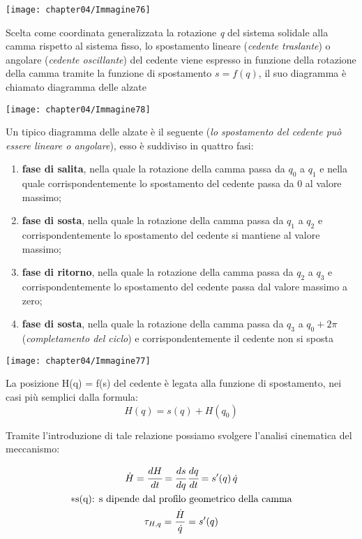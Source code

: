 		\begin{minipage}{.3\textwidth}
		\centering
		\texttt{[image: chapter04/Immagine76]}
		\end{minipage}
		\hfill
		\begin{minipage}{.7\textwidth}
	
		
		Scelta come coordinata generalizzata la rotazione \emph{q} del sistema solidale alla camma rispetto al sistema fisso, lo spostamento lineare (\emph{cedente traslante}) o angolare (\emph{cedente oscillante}) del cedente viene espresso in funzione della rotazione della camma tramite la funzione di spostamento $s = f(q)$, il suo diagramma è chiamato diagramma delle alzate
		

		\centering
		\texttt{[image: chapter04/Immagine78]}
		\end{minipage}
		
		Un tipico diagramma delle alzate è il seguente (\emph{lo spostamento del cedente può essere lineare o angolare}), esso è suddiviso in quattro fasi:
		\begin{enumerate}[$\Rightarrow$]
		\item \textbf{fase di salita}, nella quale la rotazione della camma passa da $q_0$ a $q_1$ e nella quale corrispondentemente lo spostamento del cedente passa da 0 al valore massimo;
		\item \textbf{fase di sosta}, nella quale la rotazione della camma passa da $q_1$ a $q_2$ e corrispondentemente lo spostamento del cedente si mantiene al valore massimo;
		\item \textbf{fase di ritorno}, nella quale la rotazione della camma passa da $q_2$ a $q_3$ e corrispondentemente lo spostamento del cedente passa dal valore massimo a zero;
		\item \textbf{fase di sosta}, nella quale la rotazione della camma passa da $q_3$ a $q_0 + 2 \pi$ (\emph{completamento del ciclo}) e corrispondentemente il cedente non si sposta
		\end{enumerate} 
		
		\begin{minipage}{.5\textwidth}
		\centering
		\texttt{[image: chapter04/Immagine77]}
		\end{minipage}
		\hfill
		\begin{minipage}{.5\textwidth}
		La posizione H(q) = f(s) del cedente è legata alla funzione di spostamento, nei casi più semplici dalla formula:
		\[
		H(q) = s(q) + H(q_0)
		\]
		
		Tramite l'introduzione di tale relazione possiamo svolgere l'analisi cinematica del meccanismo:
		
			\begin{gather*}
		\dot{H} = \cfrac{dH}{dt} = \cfrac{ds}{dq}\,\cfrac{dq}{dt} = s'(q)\,\dot{q} \\
		 *\text{s(q): s dipende dal profilo geometrico della camma}\\
		\tau_{H,q} = \frac{\dot{H}}{\dot{q}} = s'(q)\\
		\end{gather*}
		\end{minipage}
		
